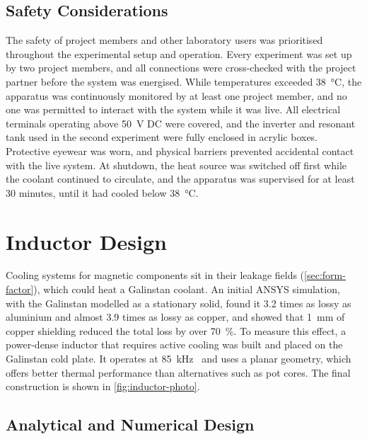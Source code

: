 \subsection{Safety Considerations}
\label{sec:safety}

The safety of project members and other laboratory users was prioritised
throughout the experimental setup and operation. Every experiment was set up by
two project members, and all connections were cross-checked with the project
partner before the system was energised. While temperatures exceeded
\SI{38}{\celsius}, the apparatus was continuously monitored by at least one
project member, and no one was permitted to interact with the system while it
was live. All electrical terminals operating above \SI{50}{\volt} DC were
covered, and the inverter and resonant tank used in the second experiment were
fully enclosed in acrylic boxes. Protective eyewear was worn, and physical
barriers prevented accidental contact with the live system. At shutdown, the
heat source was switched off first while the coolant continued to circulate,
and the apparatus was supervised for at least 30 minutes, until it had cooled
below \SI{38}{\celsius}.

\section{Inductor Design}
\label{sec:inductor-design}

Cooling systems for magnetic components sit in their leakage fields
(\cref{sec:form-factor}), which could heat a Galinstan coolant. An initial ANSYS
simulation, with the Galinstan modelled as a stationary solid, found it 3.2
times as lossy as aluminium and almost 3.9 times as lossy as copper, and showed
that \SI{1}{\milli\metre} of copper shielding reduced the total loss by over
\SI{70}{\percent}. To measure this effect, a power-dense inductor that requires
active cooling was built and placed on the Galinstan cold plate. It operates at
\SI{85}{\kilo\hertz}~\cite{society_of_automotive_engineers_r_2024} and
uses a planar geometry, which offers better thermal performance than
alternatives such as pot cores. The final construction is shown in
\cref{fig:inductor-photo}.

\subsection{Analytical and Numerical Design}
\label{sec:analytical-design}

